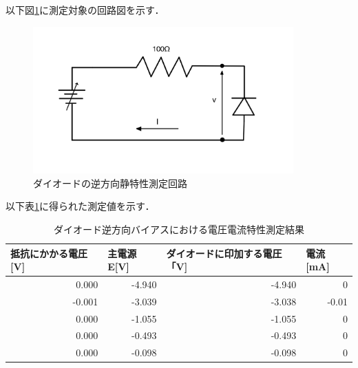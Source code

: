 \documentclass[titlepage]{jarticle}
\begin{document}
以下図\ref{fig:ダイオードの逆方向静特性測定回路}に測定対象の回路図を示す．
\begin{figure}[H]
    \begin{center}
        \includegraphics[width=10cm]{image/db.jpg}
        \caption{ダイオードの逆方向静特性測定回路}
        \label{fig:ダイオードの逆方向静特性測定回路}
    \end{center}
\end{figure}

以下表\ref{ダイオード逆方向バイアスにおける電圧電流特性測定結果}に得られた測定値を示す．

\begin{table}[htbp]
    \caption{ダイオード逆方向バイアスにおける電圧電流特性測定結果}
    \begin{center}
        \begin{tabular}{r|r|r|r}
            \hline\hline
            \multicolumn{1}{l|}{抵抗にかかる電圧[V]} & \multicolumn{1}{l|}{主電源E[V]} & \multicolumn{1}{l|}{ダイオードに印加する電圧「V]} & \multicolumn{1}{l}{電流[mA]} \\ \hline
            0.000                                    & -4.940                          & -4.940                                            & 0                            \\ \hline
            -0.001                                   & -3.039                          & -3.038                                            & -0.01                        \\ \hline
            0.000                                    & -1.055                          & -1.055                                            & 0                            \\ \hline
            0.000                                    & -0.493                          & -0.493                                            & 0                            \\ \hline
            0.000                                    & -0.098                          & -0.098                                            & 0                            \\ \hline
        \end{tabular}
    \end{center}
    \label{ダイオード逆方向バイアスにおける電圧電流特性測定結果}
\end{table}
\end{document}
